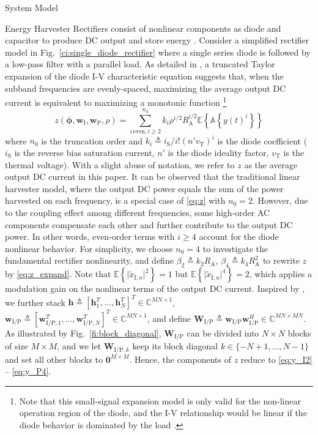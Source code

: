 \documentclass[journal]{IEEEtran}
\begin{document}
\begin{section}{System Model}
\begin{subsection}{Energy Harvester}
			Rectifiers consist of nonlinear components as diode and capacitor to produce DC output and store energy \cite{Pinuela2013}. Consider a simplified rectifier model in Fig.~\ref{ci:single_diode_rectifier} where a single series diode is followed by a low-pass filter with a parallel load. As detailed in \cite{Clerckx2016a,Clerckx2018b}, a truncated Taylor expansion of the diode I-V characteristic equation suggests that, when the subband frequencies are evenly-spaced, maximizing the average output DC current is equivalent to maximizing a monotonic function \footnote{Note that this small-signal expansion model is only valid for the non-linear operation region of the diode, and the I-V relationship would be linear if the diode behavior is dominated by the load \cite{Clerckx2016a}.}
			\begin{equation}\label{eq:z}
				z(\boldsymbol{\phi},\boldsymbol{w}_{\mathrm{I}},\boldsymbol{w}_{\mathrm{P}},\rho)=\sum_{i\,\mathrm{even},i\ge2}^{n_0}{k_i}{\rho^{i/2}}{R_{\mathrm{A}}^{i/2}}{\mathbb{E}\left\{\mathbb{A}\left\{y(t)^i\right\}\right\}}
			\end{equation}
			where $n_0$ is the truncation order and $k_i \triangleq i_{\mathrm{S}}/i!(n'v_{\mathrm{T}})^i$ is the diode coefficient ($i_{\mathrm{S}}$ is the reverse bias saturation current, $n'$ is the diode ideality factor, $v_{\mathrm{T}}$ is the thermal voltage). With a slight abuse of notation, we refer to $z$ as the average output DC current in this paper. It can be observed that the traditional linear harvester model, where the output DC power equals the sum of the power harvested on each frequency, is a special case of \eqref{eq:z} with $n_0=2$. However, due to the coupling effect among different frequencies, some high-order AC components compensate each other and further contribute to the output DC power. In other words, even-order terms with $i \ge 4$ account for the diode nonlinear behavior. For simplicity, we choose $n_0=4$ to investigate the fundamental rectifier nonlinearity, and define $\beta_2 \triangleq {k_2}{R_{\mathrm{A}}}$, $\beta_4 \triangleq {k_4}{R_{\mathrm{A}}^2}$ to rewrite $z$ by \eqref{eq:z_expand}. Note that $\mathbb{E}\left\{\lvert\tilde{x}_{\mathrm{I},n}\rvert^2\right\}=1$ but $\mathbb{E}\left\{\lvert\tilde{x}_{\mathrm{I},n}\rvert^4\right\}=2$, which applies a modulation gain on the nonlinear terms of the output DC current. Inspired by \cite{Huang2017}, we further stack $\boldsymbol{h} \triangleq [\boldsymbol{h}_1^T,\dots,\boldsymbol{h}_N^T]^T \in \mathbb{C}^{MN \times 1}$, $\boldsymbol{w}_{\mathrm{I/P}} \triangleq [\boldsymbol{w}_{\mathrm{I/P},1}^T,\dots,\boldsymbol{w}_{\mathrm{I/P},N}^T]^T \in \mathbb{C}^{MN \times 1}$, and define $\boldsymbol{W}_{\mathrm{I/P}} \triangleq \boldsymbol{w}_{\mathrm{I/P}}\boldsymbol{w}_{\mathrm{I/P}}^H \in \mathbb{C}^{MN \times MN}$. As illustrated by Fig.~\ref{fi:block_diagonal}, $\boldsymbol{W}_{\mathrm{I/P}}$ can be divided into $N \times N$ blocks of size $M \times M$, and we let $\boldsymbol{W}_{\mathrm{I/P},k}$ keep its block diagonal $k \in \{-N+1,\dots,N-1\}$ and set all other blocks to $\boldsymbol{0}^{M \times M}$. Hence, the components of $z$ reduce to \eqref{eq:y_I2} -- \eqref{eq:y_P4}.


\end{subsection}
\end{section}
\end{document}
